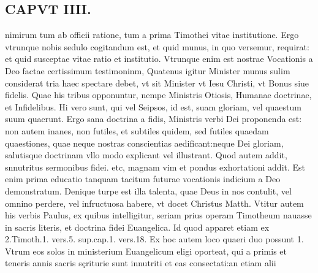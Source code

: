\documentclass{article}
\begin{document}
\begin{pages}
\section*{CAPVT  IIII. }
\marginpar{[ p.201 ]}\pstart nimirum tum ab officii ratione, tum a prima Timothei vitae institutione. Ergo vtrunque nobis sedulo cogitandum est, et quid munus, in quo versemur, requirat: et quid susceptae vitae ratio et institutio. Vtrunque enim est nostrae Vocationis a Deo factae certissimum testimoninm,  \pend\pstart Quatenus igitur Minister munus sulim considerat tria haec spectare debet, vt sit Minister vt Iesu Christi, vt Bonus siue fidelis. Quae his tribus opponuntur, nempe Ministris Otiosis, Humanae doctrinae, et Infidelibus. Hi vero sunt, qui vel Seipsos, id est, suam gloriam, vel quaestum suum quaerunt. Ergo sana doctrina a fidis, Ministris verbi Dei proponenda est: non autem inanes, non futiles, et subtiles quidem, sed futiles quaedam quaestiones, quae neque nostras conscientias aedificant:neque Dei gloriam, salutisque doctrinam vllo modo explicant vel illustrant.  \pend\pstart Quod autem addit, snnutritus sermonibus fidei. etc, magnam vim et pondus exhortationi addit. Est enim prima educatio tanquam tacitum futurae vocationis indicium a Deo demonstratum.  \pend\pstart Denique turpe est illa talenta, quae Deus in nos contulit, vel omnino perdere, vel infructuosa habere, vt docet Christus Matth. Vtitur autem his verbis Paulus, ex quibus intelligitur, seriam prius operam Timotheum nauasse in sacris literis, et doctrina fidei Euangelica. Id quod apparet etiam ex 2.Timoth.1. vers.5. sup.cap.1. vers.18. Ex hoc autem loco quaeri duo possunt 1. Vtrum eos solos in ministerium Euangelicum eligi oporteat, qui a primis et teneris annis sacris sçriturie sunt innutriti et eas consectati:an etiam alii  \pend

\end{pages}
\end{document}
